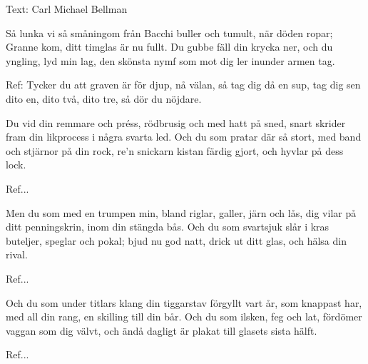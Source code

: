 \begin{SongText}
    \begin{SongInfo}
        Text: Carl Michael Bellman
    \end{SongInfo}
    \begin{SongVerse}
        Så lunka vi så småningom
        från Bacchi buller och tumult,
        när döden ropar; Granne kom,
        ditt timglas är nu fullt.
        Du gubbe fäll din krycka ner,
        och du yngling, lyd min lag,
        den skönsta nymf som mot dig ler
        inunder armen tag.
    \end{SongVerse}
    \begin{SongVerse}
        Ref:
        Tycker du att graven är för djup,
        nå välan, så tag dig då en sup,
        tag dig sen dito en, dito två, dito tre,
        så dör du nöjdare.
    \end{SongVerse}
    \begin{SongVerse}
        Du vid din remmare och préss,
        rödbrusig och med hatt på sned,
        snart skrider fram din likprocess
        i några svarta led.
        Och du som pratar där så stort,
        med band och stjärnor på din rock,
        re’n snickarn kistan färdig gjort,
        och hyvlar på dess lock.
    \end{SongVerse}
    \begin{SongVerse}
        Ref...
    \end{SongVerse}
    \begin{SongVerse}
        Men du som med en trumpen min,
        bland riglar, galler, järn och lås,
        dig vilar på ditt penningskrin,
        inom din stängda bås.
        Och du som svartsjuk slår i kras
        buteljer, speglar och pokal;
        bjud nu god natt, drick ut ditt glas,
        och hälsa din rival.
    \end{SongVerse}
    \begin{SongVerse}
        Ref...
    \end{SongVerse}
    \begin{SongVerse}
        Och du som under titlars klang
        din tiggarstav förgyllt vart år,
        som knappast har, med all din rang,
        en skilling till din bår.
        Och du som ilsken, feg och lat,
        fördömer vaggan som dig välvt,
        och ändå dagligt är plakat
        till glasets sista hälft.
    \end{SongVerse}
    \begin{SongVerse}
        Ref...
    \end{SongVerse}

\end{SongText}
